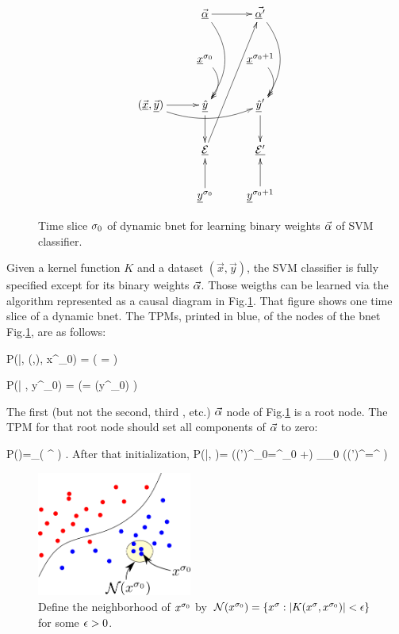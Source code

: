\begin{figure}[h!]
$$
\xymatrix{
&\vec{\ul{\alp}}\ar@/^1.5pc/[dd]
\ar[r]
&\vec{\ul{\alp}'}\ar@/^1.5pc/[dd]
\\
&\rvx^{\s_0}\ar@/^1pc/[d]
&\rvx^{\s_0+1}\ar@/^1pc/[d]
\\
(\vec{\rvx}, \vec{\rvy})\ar[r]
\ar@/_1pc/[rr]
&\ul{\haty}\ar[d]
&\ul{\haty}'\ar[d]
\\
&\ul{\cale}\ar[ruuu]
&\ul{\cale'}
\\
&\rvy^{\s_0}\ar[u]
&\rvy^{\s_0+1}\ar[u]
}
$$
\caption{Time slice $\sigma_0$ of dynamic bnet for 
learning binary weights $\vec{\alpha}$ 
of SVM classifier.
}
\label{fig-svm-bnet}
\end{figure}

Given a kernel function $K$ and a dataset 
$(\vec{x}, \vec{y})$,
the SVM classifier is fully specified
except for its binary weights $\vec{\alpha}$.
Those weigths can be learned via 
the algorithm
represented as a causal diagram  in Fig.\ref{fig-svm-bnet}.
That figure  shows one time slice
of a dynamic bnet.
The TPMs, printed in blue,
of the nodes of 
the bnet Fig.\ref{fig-svm-bnet},
are as follows:



\beq\color{blue}
P(\haty|\vec{\alp}, (,), x^{\s_0})
=
\indi(\;\;\;
\haty= 
\;\;\;)
\eeq  

\beq\color{blue}
P(\cale| \haty, y^{\s_0})
=
\indi(\;\;\;\cale =
\indi(\haty\neq y^{\s_0})
\;\;\;)
\eeq  

The first (but not the second, third , etc.)
$\vec{\alpha}$ 
node of Fig.\ref{fig-svm-bnet}
is a root node.
The TPM for that root node
should set 
all components of $\vec{\alpha}$
to zero:

\beq\color{blue}
P(\vec{\alp})=\prod_\s \indi(\;\;\;
\alp^
\;\;\;)
\;.
\eeq
After that initialization,
\beq\color{blue}
P(|\vec{\alp}, \cale)=
\indi(\;\;\;(\alp')^{\s_0}=\alp^{\s_0} +\cale\;\;\;)\;\;
\prod_{\s\neq \s_0}
\indi(\;\;\;(\alp')^\s=\alp^\s
\;\;\;)
\eeq

\begin{figure}[h!]
\centering
\includegraphics[width=2in]
{svm/svm-why.png}
\caption{Define the neighborhood
of $x^{\sigma_0}$ by  ${\cal N}(x^{\sigma_0})
=
\{x^\sigma: |K(x^\sigma,  x^{\sigma_0})|<\epsilon \}$
for some $\epsilon>0$.}
\label{fig-svm-why}
\end{figure}

